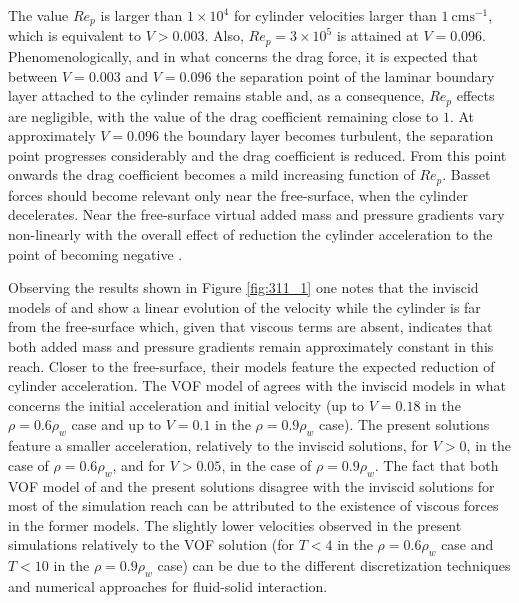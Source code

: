 The value $Re_p$ is larger than $1 \times 10^{4}$ for cylinder velocities larger than $1 \ \mathrm{cm s^{-1}}$, which is equivalent to $V > 0.003$. Also, $Re_p = 3 \times 10^{5}$ is attained at $V = 0.096$. Phenomenologically, and in what concerns the drag force, it is expected that between $V = 0.003$ and $V=0.096$ the separation point of the laminar boundary layer attached to the cylinder remains stable and, as a consequence, $Re_p$ effects are negligible, with the value of the drag coefficient remaining close to $1$. At approximately $V=0.096$ the boundary layer becomes turbulent, the separation point progresses considerably and the drag coefficient is reduced. From this point onwards the drag coefficient becomes a mild increasing function of $Re_p$. Basset forces should become relevant only near the free-surface, when the cylinder decelerates. Near the free-surface virtual added mass and pressure gradients vary non-linearly with the overall effect of reduction the cylinder acceleration to the point of becoming negative \citep{frank-1967}.

Observing the results shown in Figure \ref{fig:311_1} one notes that the inviscid models of \cite{Moyo-2000} and \cite{Fekken-2004} show a linear evolution of the velocity while the cylinder is far from the free-surface which, given that viscous terms are absent, indicates that both added mass and pressure gradients remain approximately constant in this reach. Closer to the free-surface, their models feature the expected reduction of cylinder acceleration. The \ac{VOF} model of \cite{Fekken-2004} agrees with the inviscid models in what concerns the initial acceleration and initial velocity (up to $V = 0.18$ in the $\rho=0.6\rho_{w}$ case and up to $V = 0.1$ in the $\rho=0.9\rho_{w}$ case). The present solutions feature a smaller acceleration, relatively to the inviscid solutions, for $V>0$, in the case of $\rho=0.6\rho_{w}$, and for $V>0.05$, in the case of $\rho=0.9\rho_{w}$. The fact that both \ac{VOF} model of \cite{Fekken-2004} and the present solutions disagree with the inviscid solutions for most of the simulation reach can be attributed to the existence of viscous forces in the former models. The slightly lower velocities observed in the present simulations relatively to the \ac{VOF} solution (for $T<4$ in the $\rho=0.6\rho_{w}$ case and $T<10$ in the $\rho=0.9\rho_{w}$ case) can be due to the different discretization techniques and numerical approaches for fluid-solid interaction.

